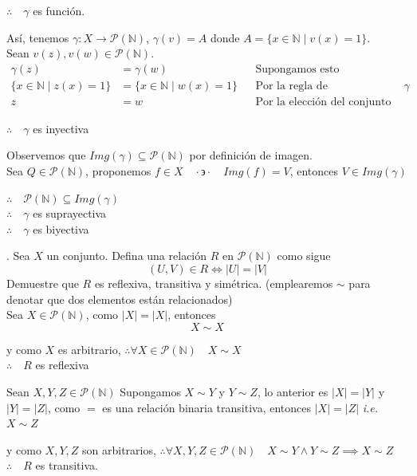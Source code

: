 \documentclass[letterpaper]{article}
\providecommand{\abs}[1]{\left|#1\right|}
\newcommand{\tq}{ \quad \cdot  \backepsilon \cdot \quad }
\newcommand{\N}{\mathds{N}}
\renewcommand{\P}{\mathcal{P}}
\renewcommand{\*}{\cdot}
\theoremstyle{definition}
\begin{document}
\begin{center}
	$ \therefore \quad \gamma $ es función.
\end{center}
Así, tenemos $ \gamma: X \to \P(\N) $, $ \gamma(v) =  A $ donde $ A = \{ x \in \N \mid v(x) = 1 \} $.\\

Sean $ v(z), v(w) \in \P(\N) $.
\begin{align*}
	\gamma(z) &= \gamma(w) &&\text{Supongamos esto}\\
	\{ x \in \N \mid z(x) = 1 \} &= \{ x \in \N \mid w(x) = 1 \} &&\text{Por la regla de correspondencia de } \gamma\\
	z &= w &&\text{Por la elección del conjunto de funciones}
\end{align*}
\begin{center}
	$ \therefore \quad \gamma $ es inyectiva
\end{center}
Observemos que $ Img(\gamma) \subseteq \P(\N) $ por definición de imagen.\\
Sea $ Q \in \P(\N)  $, proponemos $ f \in X \tq Img(f) = V$, entonces $ V \in Img(\gamma) $
\begin{center}
	$ \therefore \quad \P(\N) \subseteq Img(\gamma) $\\
	$ \therefore \quad \gamma$ es suprayectiva\\
	$ \therefore \quad \gamma$ es biyectiva
\end{center}
. Sea $ X $ un conjunto. Defina una relación $ R $ en $ \P(\N) $ como sigue
\[ (U,V) \in R \iff \abs{U} = \abs{V} \]
Demuestre que $ R $ es reflexiva, transitiva y simétrica. (emplearemos $ \sim $ para denotar que dos elementos están relacionados)\\
Sea $ X \in \P(\N)$, como $ \abs{X} = \abs{X} $, entonces
\[ X \sim X  \]
\begin{center}
	y como $ X $ es arbitrario, $\therefore \forall X \in \P(\N) \quad X \sim X  $\\
	$ \therefore \quad R $ es reflexiva
\end{center}
Sean $ X, Y, Z \in \P(\N) $
Supongamos $ X \sim Y $ y $ Y \sim Z $, lo anterior es $ \abs{X} = \abs{Y} $ y $ \abs{Y} = \abs{Z} $, como $ = $ es una relación binaria transitiva, entonces $ \abs{X} = \abs{Z} $ \textit{i.e. } $ X \sim Z $ 
\begin{center}
	y como $ X,Y, Z $ son arbitrarios, $\therefore \forall X, Y,Z \in \P(\N) \quad X \sim Y \land Y \sim  Z \implies X \sim Z  $\\
	$ \therefore \quad R $ es transitiva.
\end{center}
\end{document}
